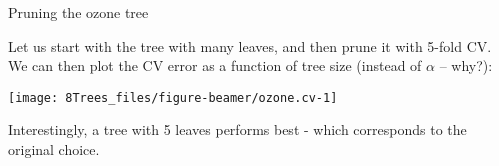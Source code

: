 \documentclass[10pt,ignorenonframetext,]{beamer}
\newenvironment{Shaded}{\begin{snugshade}}{\end{snugshade}}
\newcommand{\DataTypeTok}[1]{\textcolor[rgb]{0.13,0.29,0.53}{#1}}
\newcommand{\DecValTok}[1]{\textcolor[rgb]{0.00,0.00,0.81}{#1}}
\newcommand{\FloatTok}[1]{\textcolor[rgb]{0.00,0.00,0.81}{#1}}
\newcommand{\KeywordTok}[1]{\textcolor[rgb]{0.13,0.29,0.53}{\textbf{#1}}}
\newcommand{\NormalTok}[1]{#1}
\newcommand{\OperatorTok}[1]{\textcolor[rgb]{0.81,0.36,0.00}{\textbf{#1}}}
\newcommand{\StringTok}[1]{\textcolor[rgb]{0.31,0.60,0.02}{#1}}
\begin{document}
\begin{frame}[fragile]

\begin{block}{Pruning the ozone tree}

Let us start with the tree with many leaves, and then prune it with
5-fold CV. We can then plot the CV error as a function of tree size
(instead of \(\alpha\) -- why?):

\scriptsize

\begin{Shaded}
\end{Shaded}

\begin{center}\texttt{[image: 8Trees\_files/figure-beamer/ozone.cv-1]} \end{center}

\normalsize

Interestingly, a tree with 5 leaves performs best - which corresponds to
the original choice.

\end{block}

\end{frame}
\end{document}

